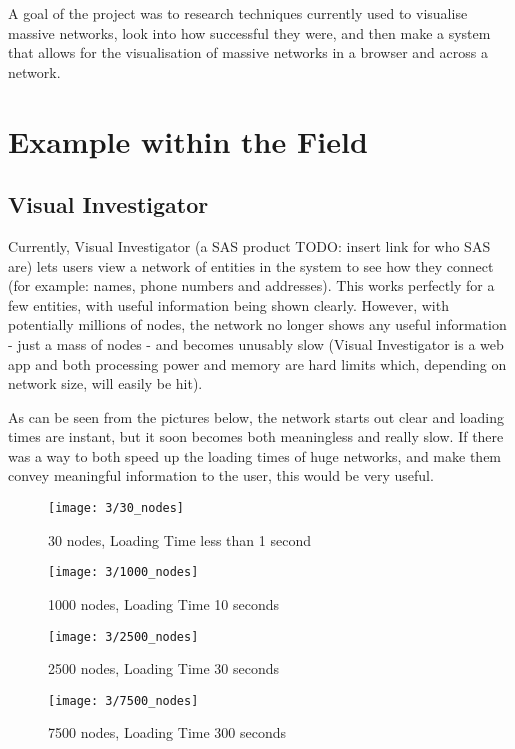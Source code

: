 \documentclass[../dissertation.tex]{subfiles}
\begin{document}
A goal of the project was to research techniques currently used to visualise massive networks, look into how successful they were, and then make a system that allows for the visualisation of massive networks in a browser and across a network. 

\section{Example within the Field}

\subsection{Visual Investigator}
Currently, Visual Investigator (a SAS product TODO: insert link for who SAS are) lets users view a network of entities in the system to see how they connect (for example: names, phone numbers and addresses). This works perfectly for a few entities, with useful information being shown clearly. However, with potentially millions of nodes, the network no longer shows any useful information - just a mass of nodes - and becomes unusably slow (Visual Investigator is a web app and both processing power and memory are hard limits which, depending on network size, will easily be hit).

As can be seen from the pictures below, the network starts out clear and loading times are instant, but it soon becomes both meaningless and really slow. If there was a way to both speed up the loading times of huge networks, and make them convey meaningful information to the user, this would be very useful.

\begin{figure}
    \centering
    \texttt{[image: 3/30\_nodes]}
    \caption{30 nodes, Loading Time less than 1 second}
\end{figure}

\begin{figure}
    \centering
    \texttt{[image: 3/1000\_nodes]}
    \caption{1000 nodes, Loading Time 10 seconds}
\end{figure}

\begin{figure}
    \centering
    \texttt{[image: 3/2500\_nodes]}
    \caption{2500 nodes, Loading Time 30 seconds}
\end{figure}

\begin{figure}
    \centering
    \texttt{[image: 3/7500\_nodes]}
    \caption{7500 nodes, Loading Time 300 seconds}
\end{figure}
\end{document}
